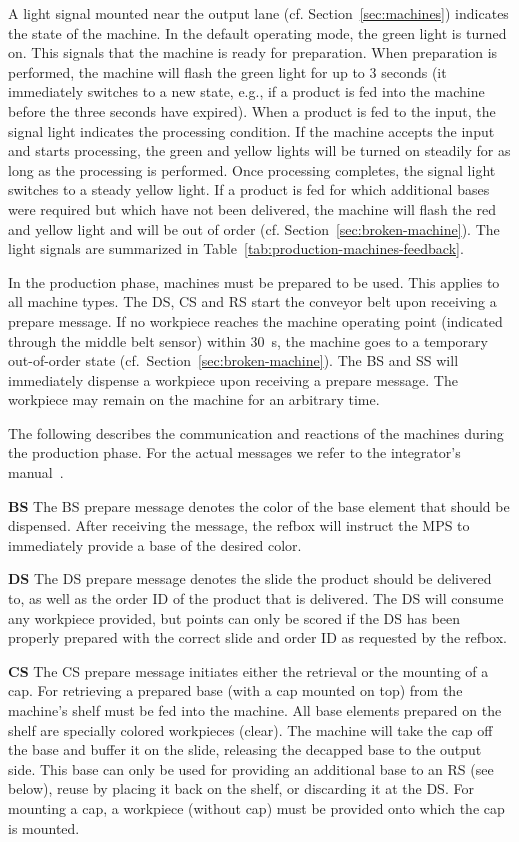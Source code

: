 \documentclass[12pt,twoside]{article}
\newcommand{\refsec}[1]{Section~\ref{#1}}
\newcommand{\reftab}[1]{Table~\ref{#1}}
\begin{document}
A light signal mounted near the output lane
(cf. \refsec{sec:machines}) indicates the state of the machine. In the
default operating mode, the green light is turned on. This signals
that the machine is ready for preparation. When preparation is performed,
the machine will flash the green light for up to 3 seconds (it
immediately switches to a new state, e.g., if a product is fed into the
machine before the three seconds have expired). When a product is fed
to the input, the signal light indicates the processing condition. If
the machine accepts the input and starts processing, the green and yellow lights
will be turned on steadily for as long as the processing is
performed. Once processing completes, the signal light switches to a
steady yellow light. If a product is fed for which additional bases
were required but which have not been delivered, the machine will
flash the red and yellow light and will be out of order
(cf. \refsec{sec:broken-machine}). The light signals are summarized in
\reftab{tab:production-machines-feedback}.

In the production phase, machines must be prepared to be used. This
applies to all machine types.  The DS, CS and RS start the conveyor
belt upon receiving a prepare message. If no workpiece reaches the
machine operating point (indicated through the middle belt sensor)
within \SI{30}{\second}, the machine goes to a temporary out-of-order
state (cf.~\refsec{sec:broken-machine}). The BS and SS will
immediately dispense a workpiece upon receiving a prepare message. The
workpiece may remain on the machine for an arbitrary time.

The following describes the communication and reactions of the
machines during the production phase. For the actual messages we refer
to the integrator's manual~\cite{RefBoxIntManual}.

\smallskip

\noindent\textbf{BS}
The BS prepare message denotes the color of the base element that should
be dispensed. After receiving the message, the refbox will instruct
the MPS to immediately provide a base of the desired color.

\noindent\textbf{DS}
The DS prepare message denotes the slide the product should be delivered
to, as well as the order ID of the product that is delivered.  The DS
will consume any workpiece provided, but points can only be scored if
the DS has been properly prepared with the correct slide and order ID
as requested by the refbox.

\noindent\textbf{CS}
The CS prepare message initiates either the retrieval or the mounting of
a cap. For retrieving a prepared base (with a cap mounted on top) from
the machine's shelf must be fed into the machine. All base elements
prepared on the shelf are specially colored workpieces (clear). The
machine will take the cap off the base and buffer it on the slide,
releasing the decapped base to the output side. This base can only be
used for providing an additional base to an RS (see below), reuse by
placing it back on the shelf, or discarding it at the DS\@.  For
mounting a cap, a workpiece (without cap) must be provided onto which
the cap is mounted.
\end{document}
